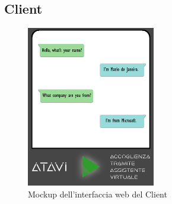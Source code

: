 \subsection{Client}
\begin{figure}[H]
	\centering
	\includegraphics[width=0.5\textwidth,height=0.8\textheight,keepaspectratio]{images/mockup.png}
	\caption{Mockup dell'interfaccia web del Client}
\end{figure}
